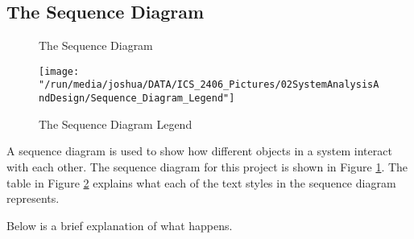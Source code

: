\documentclass[12pt,svgnames,smaller]{article} %
\begin{document}
	
	
	\subsection{The Sequence Diagram}
	\begin{figure}
		\centering
		\caption{The Sequence Diagram}
		\label{fig:SystemAnalysisandDesign-Sequence_Diagram}
	\end{figure}%
	\begin{figure}
		\centering
		\texttt{[image: "/run/media/joshua/DATA/ICS\_2406\_Pictures/02SystemAnalysisAndDesign/Sequence\_Diagram\_Legend"]}
		\caption{The Sequence Diagram Legend}
		\label{fig:SystemAnalysisandDesign-Sequence_Diagram_Legend}
	\end{figure}
	
	A sequence diagram is used to show how different objects in a system interact with each other. The sequence diagram for this project is shown in Figure \ref{fig:SystemAnalysisandDesign-Sequence_Diagram}.	The table in Figure \ref{fig:SystemAnalysisandDesign-Sequence_Diagram_Legend} explains what each of the text styles in the sequence diagram represents.
	
	Below is a brief explanation of what happens.
	
\end{document}
